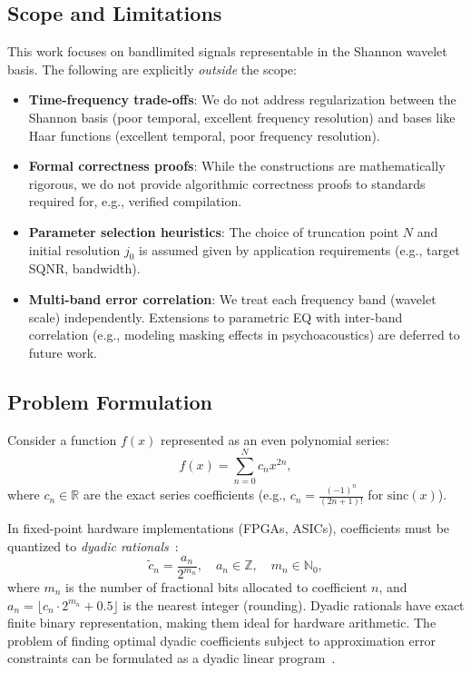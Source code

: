 \subsection{Scope and Limitations}

This work focuses on bandlimited signals representable in the Shannon wavelet basis. The following are explicitly \emph{outside} the scope:

\begin{itemize}
\item \textbf{Time-frequency trade-offs}: We do not address regularization between the Shannon basis (poor temporal, excellent frequency resolution) and bases like Haar functions (excellent temporal, poor frequency resolution).

\item \textbf{Formal correctness proofs}: While the constructions are mathematically rigorous, we do not provide algorithmic correctness proofs to standards required for, e.g., verified compilation.

\item \textbf{Parameter selection heuristics}: The choice of truncation point $N$ and initial resolution $j_0$ is assumed given by application requirements (e.g., target SQNR, bandwidth).

\item \textbf{Multi-band error correlation}: We treat each frequency band (wavelet scale) independently. Extensions to parametric EQ with inter-band correlation (e.g., modeling masking effects in psychoacoustics) are deferred to future work.
\end{itemize}

\subsection{Problem Formulation}

Consider a function $f(x)$ represented as an even polynomial series:
\begin{equation}
f(x) = \sum_{n=0}^{N} c_n x^{2n},
\label{eq:poly_series}
\end{equation}
where $c_n \in \mathbb{R}$ are the exact series coefficients (e.g., $c_n = \frac{(-1)^n}{(2n+1)!}$ for $\mathrm{sinc}(x)$).

In fixed-point hardware implementations (FPGAs, ASICs), coefficients must be quantized to \emph{dyadic rationals}~\cite{Gustafsson2007,Abdi2024}:
\begin{equation}
\tilde{c}_n = \frac{a_n}{2^{m_n}}, \quad a_n \in \mathbb{Z}, \quad m_n \in \mathbb{N}_0,
\label{eq:dyadic_quant}
\end{equation}
where $m_n$ is the number of fractional bits allocated to coefficient $n$, and $a_n = \lfloor c_n \cdot 2^{m_n} + 0.5 \rfloor$ is the nearest integer (rounding). Dyadic rationals have exact finite binary representation, making them ideal for hardware arithmetic. The problem of finding optimal dyadic coefficients subject to approximation error constraints can be formulated as a dyadic linear program~\cite{Abdi2024}.

